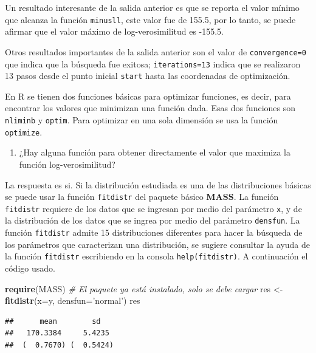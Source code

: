 \documentclass[10pt,]{krantz}
\makeatletter
\newenvironment{Shaded}{\begin{snugshade}}{\end{snugshade}}
\newcommand{\KeywordTok}[1]{\textcolor[rgb]{0.13,0.29,0.53}{\textbf{#1}}}
\newcommand{\DataTypeTok}[1]{\textcolor[rgb]{0.13,0.29,0.53}{#1}}
\newcommand{\StringTok}[1]{\textcolor[rgb]{0.31,0.60,0.02}{#1}}
\newcommand{\CommentTok}[1]{\textcolor[rgb]{0.56,0.35,0.01}{\textit{#1}}}
\newcommand{\NormalTok}[1]{#1}
\providecommand{\tightlist}{%
  \setlength{\itemsep}{0pt}\setlength{\parskip}{0pt}}
\let\proglang=\textsf
\newenvironment{kframe}{%
\medskip{}
\setlength{\fboxsep}{.8em}
 \def\at@end@of@kframe{}%
 \ifinner\ifhmode%
  \def\at@end@of@kframe{\end{minipage}}%
  \begin{minipage}{\columnwidth}%
 \fi\fi%
 \def\FrameCommand##1{\hskip\@totalleftmargin \hskip-\fboxsep
 \colorbox{shadecolor}{##1}\hskip-\fboxsep
     \hskip-\linewidth \hskip-\@totalleftmargin \hskip\columnwidth}%
 \MakeFramed {\advance\hsize-\width
   \@totalleftmargin\z@ \linewidth\hsize
   \@setminipage}}%
 {\par\unskip\endMakeFramed%
 \at@end@of@kframe}
\renewenvironment{Shaded}{\begin{kframe}}{\end{kframe}}
\let\BeginKnitrBlock\begin \let\EndKnitrBlock\end
\makeatother
\begin{document}
Un resultado interesante de la salida anterior es que se reporta el
valor mínimo que alcanza la función \texttt{minusll}, este valor fue de
155.5, por lo tanto, se puede afirmar que el valor máximo de
log-verosimilitud es -155.5.

Otros resultados importantes de la salida anterior son el valor de
\texttt{convergence=0} que indica que la búsqueda fue exitosa;
\texttt{iterations=13} indica que se realizaron 13 pasos desde el punto
inicial \texttt{start} hasta las coordenadas de optimización.

\BeginKnitrBlock{rmdnote}
En \proglang{R} se tienen dos funciones básicas para optimizar
funciones, es decir, para encontrar los valores que minimizan una
función dada. Esas dos funciones son \texttt{nliminb} y \texttt{optim}.
Para optimizar en una sola dimensión se usa la función
\texttt{optimize}.
\EndKnitrBlock{rmdnote}

\begin{enumerate}
\def\labelenumi{\arabic{enumi})}
\setcounter{enumi}{3}
\tightlist
\item
  ¿Hay alguna función para obtener directamente el valor que maximiza la
  función log-verosimilitud?
\end{enumerate}

La respuesta es si. Si la distribución estudiada es una de las
distribuciones básicas se puede usar la función \texttt{fitdistr} del
paquete básico \textbf{MASS}. La función \texttt{fitdistr} requiere de
los datos que se ingresan por medio del parámetro \texttt{x}, y de la
distribución de los datos que se ingrea por medio del parámetro
\texttt{densfun}. La función \texttt{fitdistr} admite 15 distribuciones
diferentes para hacer la búsqueda de los parámetros que caracterizan una
distribución, se sugiere consultar la ayuda de la función
\texttt{fitdistr} escribiendo en la consola \texttt{help(fitdistr)}. A
continuación el código usado. 

\begin{Shaded}
\begin{Highlighting}[]
\KeywordTok{require}\NormalTok{(MASS) }\CommentTok{# El paquete ya está instalado, solo se debe cargar}
\NormalTok{res <-}\StringTok{ }\KeywordTok{fitdistr}\NormalTok{(}\DataTypeTok{x=}\NormalTok{y, }\DataTypeTok{densfun=}\StringTok{'normal'}\NormalTok{)}
\NormalTok{res}
\end{Highlighting}
\end{Shaded}

\begin{verbatim}
##      mean        sd   
##   170.3384     5.4235 
##  (  0.7670) (  0.5424)
\end{verbatim}
\end{document}
